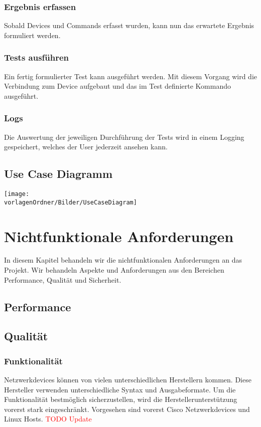 \documentclass[
	ngerman,
	toc=listof, %
	toc=bibliography, %
	footnotes=multiple, %
	parskip=half, %
	numbers=noendperiod %
]{scrartcl}
\newcommand{\vorlagenOrdner}{../../99_Vorlagen} %
\begin{document}
		\subsubsection{Ergebnis erfassen}
			Sobald Devices und Commands erfasst wurden, kann nun das 
			erwartete Ergebnis formuliert werden.

		\subsubsection{Tests ausführen}
			Ein fertig formulierter Test kann ausgeführt werden. Mit diesem Vorgang wird die
			Verbindung zum Device aufgebaut und das im Test definierte Kommando ausgeführt.

		\subsubsection{Logs}
			Die Auswertung der jeweiligen Durchführung der Tests wird in einem Logging gespeichert, welches der User jederzeit ansehen kann.

	\subsection{Use Case Diagramm}
		\texttt{[image: \\vorlagenOrdner/Bilder/UseCaseDiagram]}

\section{Nichtfunktionale Anforderungen}
	In diesem Kapitel behandeln wir die nichtfunktionalen Anforderungen an das Projekt.
	Wir behandeln Aspekte und Anforderungen aus den Bereichen Performance, Qualität und Sicherheit.
	
	\subsection{Performance}

	\subsection{Qualität}
		\subsubsection{Funktionalität}
		Netzwerkdevices können von vielen unterschiedlichen Herstellern kommen. 
		Diese Hersteller verwenden unterschiedliche Syntax und Ausgabeformate. 
		Um die Funktionalität bestmöglich sicherzustellen, wird die Herstellerunterstützung vorerst stark eingeschränkt. 
		Vorgesehen sind vorerst Cisco Netzwerkdevices und Linux Hosts. \textcolor{red}{TODO Update}
\end{document}
